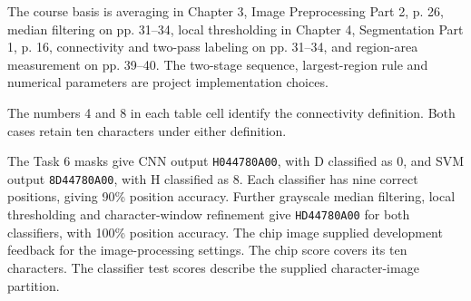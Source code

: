 The course basis is averaging in Chapter 3, Image Preprocessing Part 2, p. 26, median filtering on pp. 31--34, local thresholding in Chapter 4, Segmentation Part 1, p. 16, connectivity and two-pass labeling on pp. 31--34, and region-area measurement on pp. 39--40. The two-stage sequence, largest-region rule and numerical parameters are project implementation choices.


The numbers 4 and 8 in each table cell identify the connectivity definition. Both cases retain ten characters under either definition.

The Task 6 masks give CNN output \texttt{H044780A00}, with D classified as 0, and SVM output \texttt{8D44780A00}, with H classified as 8. Each classifier has nine correct positions, giving 90\% position accuracy. Further grayscale median filtering, local thresholding and character-window refinement give \texttt{HD44780A00} for both classifiers, with 100\% position accuracy.
The chip image supplied development feedback for the image-processing settings. The chip score covers its ten characters. The classifier test scores describe the supplied character-image partition.
